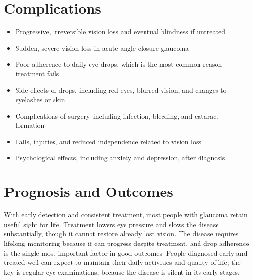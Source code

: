 \section*{Complications}
\begin{itemize}
    \item Progressive, irreversible vision loss and eventual blindness if untreated
    \item Sudden, severe vision loss in acute angle-closure glaucoma
    \item Poor adherence to daily eye drops, which is the most common reason treatment fails
    \item Side effects of drops, including red eyes, blurred vision, and changes to eyelashes or skin
    \item Complications of surgery, including infection, bleeding, and cataract formation
    \item Falls, injuries, and reduced independence related to vision loss
    \item Psychological effects, including anxiety and depression, after diagnosis
\end{itemize}

\section*{Prognosis and Outcomes}
With early detection and consistent treatment, most people with glaucoma retain useful sight for life. Treatment lowers eye pressure and slows the disease substantially, though it cannot restore already lost vision. The disease requires lifelong monitoring because it can progress despite treatment, and drop adherence is the single most important factor in good outcomes. People diagnosed early and treated well can expect to maintain their daily activities and quality of life; the key is regular eye examinations, because the disease is silent in its early stages.

